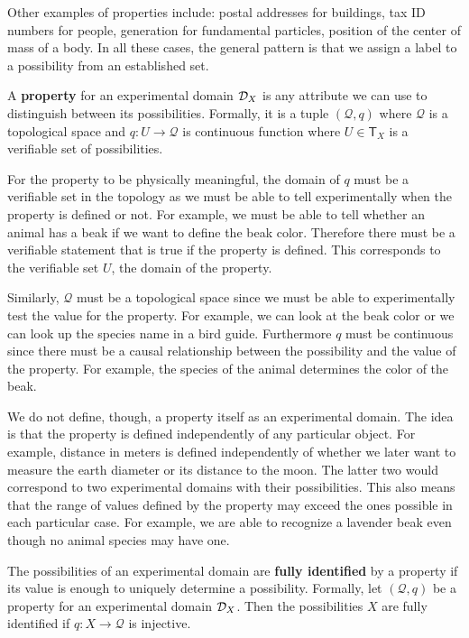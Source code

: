 \documentclass[11pt,letterpaper,fleqn]{memoir} %
\begin{document}
Other examples of properties include: postal addresses for buildings, tax ID numbers for people, generation for fundamental particles, position of the center of mass of a body. In all these cases, the general pattern is that we assign a label to a possibility from an established set.

\begin{mathSection}
	\begin{defn}
		A \textbf{property} for an experimental domain $\mathcal{D}_X$ is any attribute we can use to distinguish between its possibilities. Formally, it is a tuple $(\mathcal{Q}, q)$ where $\mathcal{Q}$ is a topological space and $q : U \to \mathcal{Q}$ is continuous function where $U \in \mathsf{T}_X$ is a verifiable set of possibilities.
	\end{defn}
	\begin{justification}
		For the property to be physically meaningful, the domain of $q$ must be a verifiable set in the topology as we must be able to tell experimentally when the property is defined or not. For example, we must be able to tell whether an animal has a beak if we want to define the beak color. Therefore there must be a verifiable statement that is true if the property is defined. This corresponds to the verifiable set $U$, the domain of the property.
		
		Similarly, $\mathcal{Q}$ must be a topological space since we must be able to experimentally test the value for the property. For example, we can look at the beak color or we can look up the species name in a bird guide. Furthermore $q$ must be continuous since there must be a causal relationship between the possibility and the value of the property. For example, the species of the animal determines the color of the beak.
		
		We do not define, though, a property itself as an experimental domain. The idea is that the property is defined independently of any particular object. For example, distance in meters is defined independently of whether we later want to measure the earth diameter or its distance to the moon. The latter two would correspond to two experimental domains with their possibilities. This also means that the range of values defined by the property may exceed the ones possible in each particular case. For example, we are able to recognize a lavender beak even though no animal species may have one.
	\end{justification}
	\begin{defn}
		The possibilities of an experimental domain are \textbf{fully identified} by a property if its value is enough to uniquely determine a possibility. Formally, let $(\mathcal{Q}, q)$ be a property for an experimental domain $\mathcal{D}_X$. Then the possibilities $X$ are fully identified if $q: X \to \mathcal{Q}$ is injective.
	\end{defn}


\end{mathSection}
\end{document}

